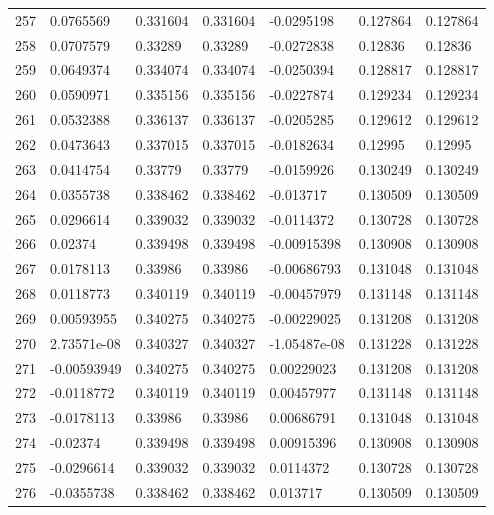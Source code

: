\begin{longtable}{l|lll|lll}
 257 &  0.0765569   & 0.331604    & 0.331604    & -0.0295198   & 0.127864    & 0.127864    \\
 258 &  0.0707579   & 0.33289     & 0.33289     & -0.0272838   & 0.12836     & 0.12836     \\
 259 &  0.0649374   & 0.334074    & 0.334074    & -0.0250394   & 0.128817    & 0.128817    \\
 260 &  0.0590971   & 0.335156    & 0.335156    & -0.0227874   & 0.129234    & 0.129234    \\
 261 &  0.0532388   & 0.336137    & 0.336137    & -0.0205285   & 0.129612    & 0.129612    \\
 262 &  0.0473643   & 0.337015    & 0.337015    & -0.0182634   & 0.12995     & 0.12995     \\
 263 &  0.0414754   & 0.33779     & 0.33779     & -0.0159926   & 0.130249    & 0.130249    \\
 264 &  0.0355738   & 0.338462    & 0.338462    & -0.013717    & 0.130509    & 0.130509    \\
 265 &  0.0296614   & 0.339032    & 0.339032    & -0.0114372   & 0.130728    & 0.130728    \\
 266 &  0.02374     & 0.339498    & 0.339498    & -0.00915398  & 0.130908    & 0.130908    \\
 267 &  0.0178113   & 0.33986     & 0.33986     & -0.00686793  & 0.131048    & 0.131048    \\
 268 &  0.0118773   & 0.340119    & 0.340119    & -0.00457979  & 0.131148    & 0.131148    \\
 269 &  0.00593955  & 0.340275    & 0.340275    & -0.00229025  & 0.131208    & 0.131208    \\
 270 &  2.73571e-08 & 0.340327    & 0.340327    & -1.05487e-08 & 0.131228    & 0.131228    \\
 271 & -0.00593949  & 0.340275    & 0.340275    &  0.00229023  & 0.131208    & 0.131208    \\
 272 & -0.0118772   & 0.340119    & 0.340119    &  0.00457977  & 0.131148    & 0.131148    \\
 273 & -0.0178113   & 0.33986     & 0.33986     &  0.00686791  & 0.131048    & 0.131048    \\
 274 & -0.02374     & 0.339498    & 0.339498    &  0.00915396  & 0.130908    & 0.130908    \\
 275 & -0.0296614   & 0.339032    & 0.339032    &  0.0114372   & 0.130728    & 0.130728    \\
 276 & -0.0355738   & 0.338462    & 0.338462    &  0.013717    & 0.130509    & 0.130509    \\

\end{longtable}
